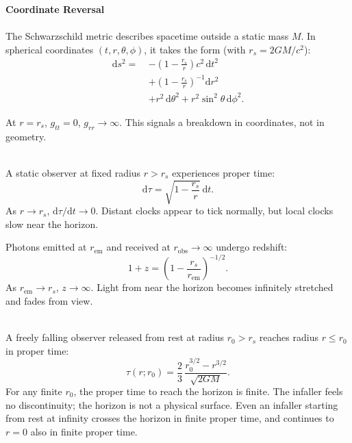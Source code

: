 \begin{technical}
{\Large\textbf{Coordinate Reversal}}\\[0.1em]

\\[0.5em]
The Schwarzschild metric describes spacetime outside a static mass \(M\). In spherical coordinates \((t, r, \theta, \phi)\), it takes the form (with \( r_s = 2GM/c^2 \)):
\begin{align*}
\mathrm{d}s^2 =\ 
& -\left(1 - \frac{r_s}{r}\right)c^2\,\mathrm{d}t^2 \nonumber \\
& + \left(1 - \frac{r_s}{r}\right)^{-1}\mathrm{d}r^2 \nonumber \\
& + r^2\,\mathrm{d}\theta^2 + r^2\sin^2\theta\,\mathrm{d}\phi^2.
\end{align*}


At \(r = r_s\), \(g_{tt} = 0\), \(g_{rr} \to \infty\). This signals a breakdown in coordinates, not in geometry.

\vspace{0.3em}
\\[0.5em]
A static observer at fixed radius \(r > r_s\) experiences proper time:
\begin{equation*}
\mathrm{d}\tau = \sqrt{1 - \frac{r_s}{r}}\,\mathrm{d}t.
\end{equation*}
As \(r \to r_s\), \(\mathrm{d}\tau/\mathrm{d}t \to 0\). Distant clocks appear to tick normally, but local clocks slow near the horizon.

Photons emitted at \(r_{\text{em}}\) and received at \(r_{\text{obs}} \to \infty\) undergo redshift:
\begin{equation*}
1 + z = \left(1 - \frac{r_s}{r_{\text{em}}}\right)^{-1/2}.
\end{equation*}
As \(r_{\text{em}} \to r_s\), \(z \to \infty\). Light from near the horizon becomes infinitely stretched and fades from view.

\vspace{0.3em}
\\[0.5em]
A freely falling observer released from rest at radius \(r_0 > r_s\) reaches radius \(r \le r_0\) in proper time:
\begin{equation*}
\tau(r; r_0) = \frac{2}{3}\,\frac{r_0^{3/2} - r^{3/2}}{\sqrt{2GM}}.
\end{equation*}
For any finite \(r_0\), the proper time to reach the horizon is finite. The infaller feels no discontinuity; the horizon is not a physical surface. Even an infaller starting from rest at infinity crosses the horizon in finite proper time, and continues to \(r=0\) also in finite proper time.


\end{technical}
